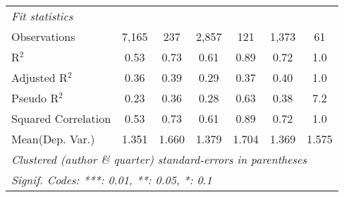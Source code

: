 \begin{tabular}{lcccccc}
   \midrule
   \emph{Fit statistics}\\
   Observations                                               & 7,165         & 237          & 2,857         & 121     & 1,373          & 61\\  
   R$^2$                                                      & 0.53          & 0.73         & 0.61          & 0.89    & 0.72           & 1.0\\  
   Adjusted R$^2$                                             & 0.36          & 0.39         & 0.29          & 0.37    & 0.40           & 1.0\\  
   Pseudo R$^2$                                               & 0.23          & 0.36         & 0.28          & 0.63    & 0.38           & 7.2\\  
   Squared Correlation                                        & 0.53          & 0.73         & 0.61          & 0.89    & 0.72           & 1.0\\  
Mean(Dep. Var.) & 1.351 & 1.660 & 1.379 & 1.704 & 1.369 & 1.575 \\
   \midrule \midrule
   \multicolumn{7}{l}{\emph{Clustered (author \& quarter) standard-errors in parentheses}}\\
   \multicolumn{7}{l}{\emph{Signif. Codes: ***: 0.01, **: 0.05, *: 0.1}}\\
\end{tabular}
\par\endgroup
